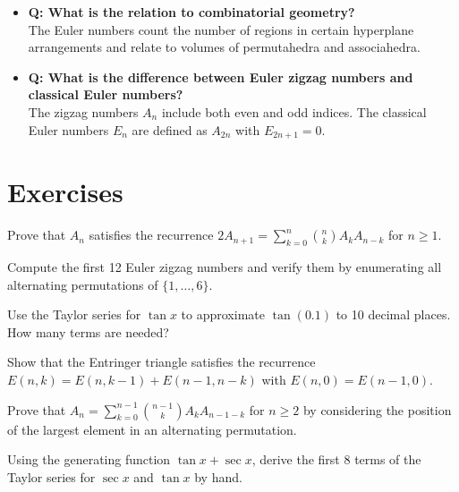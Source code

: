 \begin{itemize}
\item \textbf{Q: What is the relation to combinatorial geometry?} \\
The Euler numbers count the number of regions in certain hyperplane arrangements and relate to volumes of permutahedra and associahedra.

\item \textbf{Q: What is the difference between Euler zigzag numbers and classical Euler numbers?} \\
The zigzag numbers $A_n$ include both even and odd indices. The classical Euler numbers $E_n$ are defined as $A_{2n}$ with $E_{2n+1} = 0$.
\end{itemize}

\section{Exercises}

\begin{exercise}
Prove that $A_n$ satisfies the recurrence $2A_{n+1} = \sum_{k=0}^{n} \binom{n}{k} A_k A_{n-k}$ for $n \geq 1$.
\end{exercise}

\begin{exercise}
Compute the first 12 Euler zigzag numbers and verify them by enumerating all alternating permutations of $\{1, \ldots, 6\}$.
\end{exercise}

\begin{exercise}
Use the Taylor series for $\tan x$ to approximate $\tan(0.1)$ to 10 decimal places. How many terms are needed?
\end{exercise}

\begin{exercise}
Show that the Entringer triangle satisfies the recurrence $E(n,k) = E(n,k-1) + E(n-1,n-k)$ with $E(n,0) = E(n-1,0)$.
\end{exercise}

\begin{exercise}
Prove that $A_n = \sum_{k=0}^{n-1} \binom{n-1}{k} A_k A_{n-1-k}$ for $n \geq 2$ by considering the position of the largest element in an alternating permutation.
\end{exercise}

\begin{exercise}
Using the generating function $\tan x + \sec x$, derive the first 8 terms of the Taylor series for $\sec x$ and $\tan x$ by hand.
\end{exercise}

